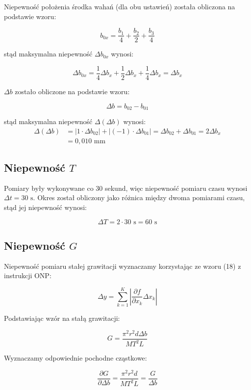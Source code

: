 \documentclass[a4paper,12pt]{article}
\begin{document}
Niepewność położenia środka wahań (dla obu ustawień) została obliczona na podstawie wzoru:

$$
b_{0x} = \frac{b_1}{4} + \frac{b_2}{2} + \frac{b_3}{4}
$$

stąd maksymalna niepewność $\Delta b_{0x}$ wynosi:

$$
\Delta b_{0x} = \frac{1}{4}\Delta b_x + \frac{1}{2}\Delta b_x + \frac{1}{4}\Delta b_x = \Delta b_x
$$

$\Delta b$ zostało obliczone na podstawie wzoru:

$$
\Delta b = b_{02} - b_{01}
$$

stąd maksymalna niepewność $\Delta(\Delta b)$ wynosi:
\begin{align*}
\Delta(\Delta b) &= |1 \cdot \Delta b_{02}| + |(-1) \cdot \Delta b_{01}| = \Delta b_{02} + \Delta b_{01} = 2\Delta b_x \\
&= 0,010 \text{ mm}
\end{align*}


\subsection{Niepewność $T$}

Pomiary były wykonywane co 30 sekund, więc niepewność pomiaru czasu wynosi $\Delta t = 30 \text{ s}$.
Okres został obliczony jako różnica między dwoma pomiarami czasu, stąd jej niepewność wynosi:

$$
\Delta T = 2 \cdot 30 \text{ s} = 60 \text{ s}
$$

\subsection{Niepewność $G$}

Niepewność pomiaru stałej grawitacji wyznaczamy korzystając ze wzoru (18) z instrukcji ONP:

\begin{equation*}
\label{eq:delta_y}
\Delta y = \sum_{k=1}^{K} \left| \frac{\partial f}{\partial x_k} \Delta x_k \right|
\end{equation*}

Podstawiając wzór na stałą grawitacji:

\begin{equation*}
\label{eq:g}
G = \frac{\pi^2 r^2 d \Delta b}{MT^2L}
\end{equation*}

Wyznaczamy odpowiednie pochodne cząstkowe:

\begin{equation*}
\frac{\partial G}{\partial \Delta b} = \frac{\pi^2 r^2 d}{MT^2L} = \frac{G}{\Delta b}
\end{equation*}
\end{document}
